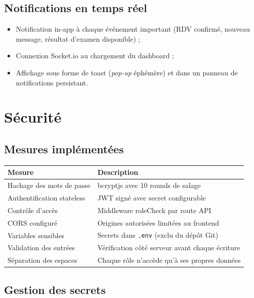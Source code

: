 \documentclass[12pt, a4paper]{report}
\begin{document}
\section{Notifications en temps réel}

\begin{itemize}
  \item Notification in-app à chaque événement important (RDV confirmé,
        nouveau message, résultat d'examen disponible) ;
  \item Connexion Socket.io au chargement du dashboard ;
  \item Affichage sous forme de toast (\textit{pop-up} éphémère) et dans
        un panneau de notifications persistant.
\end{itemize}

\chapter{Sécurité}

\section{Mesures implémentées}

\begin{center}
\begin{tabular}{p{4cm} p{9cm}}
  \toprule
  \textbf{Mesure} & \textbf{Description} \\
  \midrule
  Hachage des mots de passe & bcryptjs avec 10 rounds de salage \\
  Authentification stateless & JWT signé avec secret configurable \\
  Contrôle d'accès & Middleware roleCheck par route API \\
  CORS configuré & Origines autorisées limitées au frontend \\
  Variables sensibles & Secrets dans \texttt{.env} (exclu du dépôt Git) \\
  Validation des entrées & Vérification côté serveur avant chaque écriture \\
  Séparation des espaces & Chaque rôle n'accède qu'à ses propres données \\
  \bottomrule
\end{tabular}
\end{center}

\section{Gestion des secrets}
\end{document}
